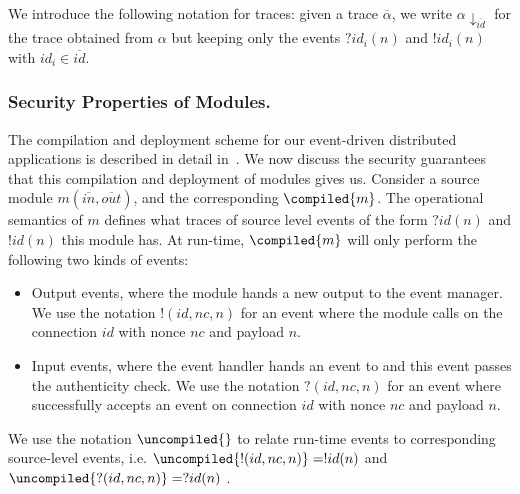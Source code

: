 We introduce the following notation for traces: given a trace $\overline{\alpha}$, we write $\alpha\downarrow_{\overline{id}}$ for the trace obtained from $\alpha$ but keeping only 
the events $?id_i(n)$ and $!id_i(n)$ with $id_i \in \overline{id}$.


\subsubsection{Security Properties of Modules.}
%
The compilation and deployment scheme for our event-driven distributed
applications is described in detail in~\cite{noorman:authentic-execution}.
We now discuss the security guarantees that this compilation and deployment of modules gives us.
Consider a source module $m(\overline{in},\overline{out})$, and the
corresponding \protmod{}  $\compiled{m}$.
The operational semantics of $m$ defines what traces of source level events of the form $?id(n)$ and $!id(n)$ this module has.
At run-time, $\compiled{m}$ will only perform the following two kinds of events:
\begin{itemize}
  \item  Output events, where the module hands a new output to the event manager.
         We use the notation $!(id,nc,n)$ for  an event where the module calls \handleoutput{} on the connection $id$ with nonce $nc$ and payload $n$.
  \item Input events, where the event handler hands an event to \handleinput{} and this event passes the authenticity check.
        We use the notation $?(id,nc,n)$ for an event where \handleinput{} successfully accepts an event on connection $id$ with nonce $nc$ and payload $n$.
\end{itemize}

We use the notation $\uncompiled{ }$ to relate run-time events to corresponding source-level events, i.e. $\uncompiled{!(id,nc,n) } = !id(n)$  and $\uncompiled{?(id,nc,n)} = ?id(n)$ .

